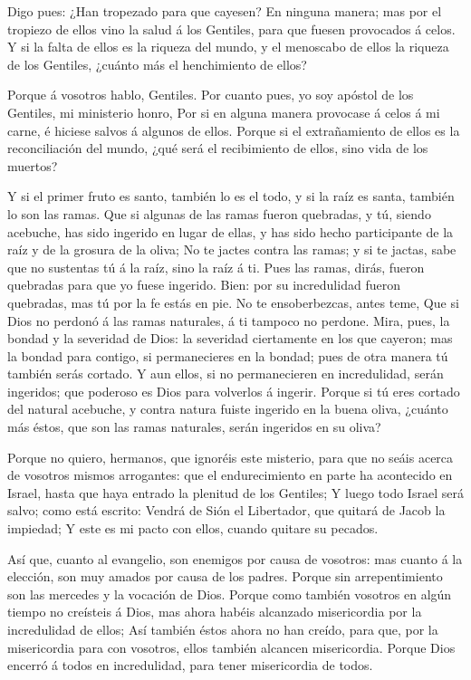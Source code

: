  Digo pues: ¿Han tropezado para que cayesen? En ninguna
manera; mas por el tropiezo de ellos vino la salud á los Gentiles, para
que fuesen provocados á celos.  Y si la falta de ellos es
la riqueza del mundo, y el menoscabo de ellos la riqueza de los
Gentiles, ¿cuánto más el henchimiento de ellos?

 Porque á vosotros hablo, Gentiles. Por cuanto pues, yo soy
apóstol de los Gentiles, mi ministerio honro,  Por si en
alguna manera provocase á celos á mi carne, é hiciese salvos á algunos
de ellos.  Porque si el extrañamiento de ellos es la
reconciliación del mundo, ¿qué será el recibimiento de ellos, sino vida
de los muertos?

 Y si el primer fruto es santo, también lo es el todo, y si
la raíz es santa, también lo son las ramas.  Que si algunas
de las ramas fueron quebradas, y tú, siendo acebuche, has sido ingerido
en lugar de ellas, y has sido hecho participante de la raíz y de la
grosura de la oliva;  No te jactes contra las ramas; y si
te jactas, sabe que no sustentas tú á la raíz, sino la raíz á ti.
 Pues las ramas, dirás, fueron quebradas para que yo fuese
ingerido.  Bien: por su incredulidad fueron quebradas, mas
tú por la fe estás en pie. No te ensoberbezcas, antes teme,
 Que si Dios no perdonó á las ramas naturales, á ti tampoco
no perdone.  Mira, pues, la bondad y la severidad de Dios:
la severidad ciertamente en los que cayeron; mas la bondad para contigo,
si permanecieres en la bondad; pues de otra manera tú también serás
cortado.  Y aun ellos, si no permanecieren en incredulidad,
serán ingeridos; que poderoso es Dios para volverlos á ingerir.
 Porque si tú eres cortado del natural acebuche, y contra
natura fuiste ingerido en la buena oliva, ¿cuánto más éstos, que son las
ramas naturales, serán ingeridos en su oliva?

 Porque no quiero, hermanos, que ignoréis este misterio,
para que no seáis acerca de vosotros mismos arrogantes: que el
endurecimiento en parte ha acontecido en Israel, hasta que haya entrado
la plenitud de los Gentiles;  Y luego todo Israel será
salvo; como está escrito: Vendrá de Sión el Libertador, que quitará de
Jacob la impiedad;  Y este es mi pacto con ellos, cuando
quitare su pecados.

 Así que, cuanto al evangelio, son enemigos por causa de
vosotros: mas cuanto á la elección, son muy amados por causa de los
padres.  Porque sin arrepentimiento son las mercedes y la
vocación de Dios.  Porque como también vosotros en algún
tiempo no creísteis á Dios, mas ahora habéis alcanzado misericordia por
la incredulidad de ellos;  Así también éstos ahora no han
creído, para que, por la misericordia para con vosotros, ellos también
alcancen misericordia.  Porque Dios encerró á todos en
incredulidad, para tener misericordia de todos.

